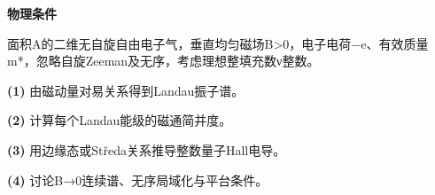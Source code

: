 \textbf{物理条件}\par 面积A的二维无自旋自由电子气，垂直均匀磁场B>0，电子电荷−e、有效质量m*，忽略自旋Zeeman及无序，考虑理想整填充数ν整数。
\par\noindent\textbf{(1)} 由磁动量对易关系得到Landau振子谱。
\par\noindent\textbf{(2)} 计算每个Landau能级的磁通简并度。
\par\noindent\textbf{(3)} 用边缘态或Středa关系推导整数量子Hall电导。
\par\noindent\textbf{(4)} 讨论B→0连续谱、无序局域化与平台条件。
